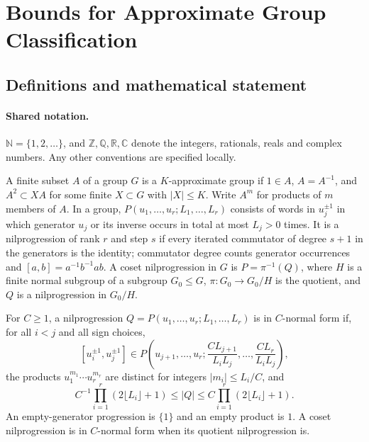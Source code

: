 \documentclass[11pt]{article}
\begin{document}
\section{Bounds for Approximate Group Classification}\label{statement}

\subsection{Definitions and mathematical statement}

\paragraph{Shared notation.}$\mathbb N=\{1,2,\ldots\}$, and $\mathbb Z,\mathbb Q,\mathbb R,\mathbb C$ denote the integers, rationals, reals and complex numbers. Any other conventions are specified locally.


A finite subset $A$ of a group $G$ is a $K$-approximate group if $1\in A$, $A=A^{-1}$, and $A^2\subset XA$ for some finite $X\subset G$ with $|X|\leq K$. Write $A^m$ for products of $m$ members of $A$. In a group, $P(u_1,\ldots,u_r;L_1,\ldots,L_r)$ consists of words in $u_j^{\pm1}$ in which generator $u_j$ or its inverse occurs in total at most $L_j>0$ times. It is a nilprogression of rank $r$ and step $s$ if every iterated commutator of degree $s+1$ in the generators is the identity; commutator degree counts generator occurrences and $[a,b]=a^{-1}b^{-1}ab$. A coset nilprogression in $G$ is $P=\pi^{-1}(Q)$, where $H$ is a finite normal subgroup of a subgroup $G_0\leq G$, $\pi:G_0\to G_0/H$ is the quotient, and $Q$ is a nilprogression in $G_0/H$.

For $C\geq1$, a nilprogression $Q=P(u_1,\ldots,u_r;L_1,\ldots,L_r)$ is in $C$-normal form if, for all $i<j$ and all sign choices,
\[
 [u_i^{\pm1},u_j^{\pm1}]\in
 P\left(u_{j+1},\ldots,u_r;\frac{CL_{j+1}}{L_iL_j},\ldots,\frac{CL_r}{L_iL_j}\right),
\]
the products $u_1^{m_1}\cdots u_r^{m_r}$ are distinct for integers $|m_i|\leq L_i/C$, and
\[
 C^{-1}\prod_{i=1}^r(2\lfloor L_i\rfloor+1)\leq|Q|\leq C\prod_{i=1}^r(2\lfloor L_i\rfloor+1).
\]
An empty-generator progression is $\{1\}$ and an empty product is $1$. A coset nilprogression is in $C$-normal form when its quotient nilprogression is.
\end{document}
